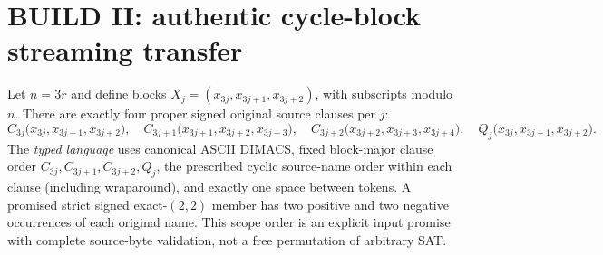 \documentclass[11pt]{article}
\begin{document}
\section{BUILD II: authentic cycle-block streaming transfer}
Let $n=3r$ and define blocks $X_j=(x_{3j},x_{3j+1},x_{3j+2})$, with subscripts modulo $n$. There are exactly four proper signed original source clauses per $j$:
\[
 C_{3j}\bigl(x_{3j},x_{3j+1},x_{3j+2}\bigr),\quad
 C_{3j+1}\bigl(x_{3j+1},x_{3j+2},x_{3j+3}\bigr),\quad
 C_{3j+2}\bigl(x_{3j+2},x_{3j+3},x_{3j+4}\bigr),\quad
 Q_j\bigl(x_{3j},x_{3j+1},x_{3j+2}\bigr).
\]
The \emph{typed language} uses canonical ASCII DIMACS, fixed block-major clause order $C_{3j},C_{3j+1},C_{3j+2},Q_j$, the prescribed cyclic source-name order within each clause (including wraparound), and exactly one space between tokens. A promised strict signed exact-$(2,2)$ member has two positive and two negative occurrences of each original name. This scope order is an explicit input promise with complete source-byte validation, not a free permutation of arbitrary SAT.
\end{document}
